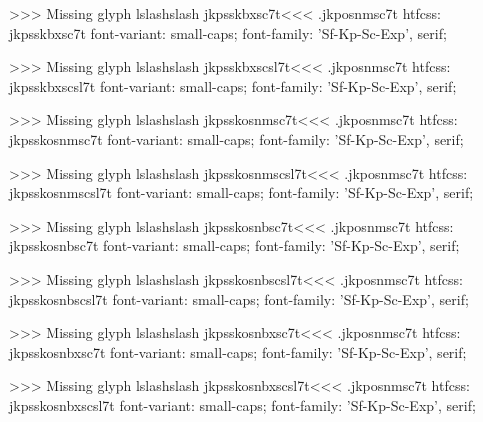 >>>
Missing glyph	lslashslash
\<jkpsskbxsc7t\><<<
.jkposnmsc7t
htfcss:  jkpsskbxsc7t  font-variant: small-caps; font-family: 'Sf-Kp-Sc-Exp', serif;

>>>
Missing glyph	lslashslash
\<jkpsskbxscsl7t\><<<
.jkposnmsc7t
htfcss:  jkpsskbxscsl7t  font-variant: small-caps; font-family: 'Sf-Kp-Sc-Exp', serif;

>>>
Missing glyph	lslashslash
\<jkpsskosnmsc7t\><<<
.jkposnmsc7t
htfcss:  jkpsskosnmsc7t  font-variant: small-caps; font-family: 'Sf-Kp-Sc-Exp', serif;

>>>
Missing glyph	lslashslash
\<jkpsskosnmscsl7t\><<<
.jkposnmsc7t
htfcss:  jkpsskosnmscsl7t  font-variant: small-caps; font-family: 'Sf-Kp-Sc-Exp', serif;

>>>
Missing glyph	lslashslash
\<jkpsskosnbsc7t\><<<
.jkposnmsc7t
htfcss:  jkpsskosnbsc7t  font-variant: small-caps; font-family: 'Sf-Kp-Sc-Exp', serif;

>>>
Missing glyph	lslashslash
\<jkpsskosnbscsl7t\><<<
.jkposnmsc7t
htfcss:  jkpsskosnbscsl7t  font-variant: small-caps; font-family: 'Sf-Kp-Sc-Exp', serif;

>>>
Missing glyph	lslashslash
\<jkpsskosnbxsc7t\><<<
.jkposnmsc7t
htfcss:  jkpsskosnbxsc7t  font-variant: small-caps; font-family: 'Sf-Kp-Sc-Exp', serif;

>>>
Missing glyph	lslashslash
\<jkpsskosnbxscsl7t\><<<
.jkposnmsc7t
htfcss:  jkpsskosnbxscsl7t  font-variant: small-caps; font-family: 'Sf-Kp-Sc-Exp', serif;

